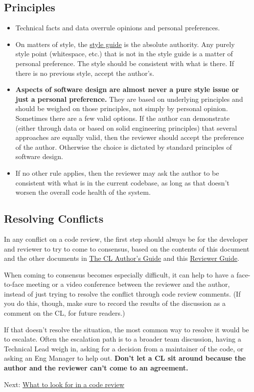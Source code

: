 \documentclass[
]{article}
\begin{document}
\subsection{Principles}\label{principles}

\begin{itemize}
\item
  Technical facts and data overrule opinions and personal preferences.
\item
  On matters of style, the
  \href{http://google.github.io/styleguide/}{style guide} is the
  absolute authority. Any purely style point (whitespace, etc.) that is
  not in the style guide is a matter of personal preference. The style
  should be consistent with what is there. If there is no previous
  style, accept the author's.
\item
  \textbf{Aspects of software design are almost never a pure style issue
  or just a personal preference.} They are based on underlying
  principles and should be weighed on those principles, not simply by
  personal opinion. Sometimes there are a few valid options. If the
  author can demonstrate (either through data or based on solid
  engineering principles) that several approaches are equally valid,
  then the reviewer should accept the preference of the author.
  Otherwise the choice is dictated by standard principles of software
  design.
\item
  If no other rule applies, then the reviewer may ask the author to be
  consistent with what is in the current codebase, as long as that
  doesn't worsen the overall code health of the system.
\end{itemize}

\subsection{Resolving Conflicts}\label{conflicts}

In any conflict on a code review, the first step should always be for
the developer and reviewer to try to come to consensus, based on the
contents of this document and the other documents in
\href{../developer/index.md}{The CL Author's Guide} and this
\href{index.md}{Reviewer Guide}.

When coming to consensus becomes especially difficult, it can help to
have a face-to-face meeting or a video conference between the reviewer
and the author, instead of just trying to resolve the conflict through
code review comments. (If you do this, though, make sure to record the
results of the discussion as a comment on the CL, for future readers.)

If that doesn't resolve the situation, the most common way to resolve it
would be to escalate. Often the escalation path is to a broader team
discussion, having a Technical Lead weigh in, asking for a decision from
a maintainer of the code, or asking an Eng Manager to help out.
\textbf{Don't let a CL sit around because the author and the reviewer
can't come to an agreement.}

Next: \href{looking-for.md}{What to look for in a code review}
\end{document}
